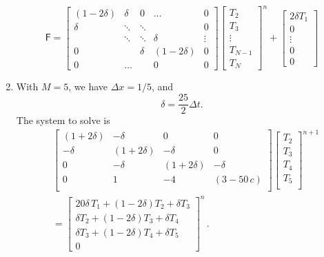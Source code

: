 \documentclass[11pt]{article}
\newcommand{\per}{\, .}
\def\beq{\begin{equation}}
\def\eeq{\end{equation}}
\begin{document}
\begin{enumerate}[label=(\alph*)]
\beq
\mathsf{F} = \left[ \begin{matrix}
        (1-2\delta) & \delta &0 &\ldots &0\\
        \delta & \ddots & \ddots & &0\\
               & \ddots &\ddots & \delta &\vdots\\
        0 & & \delta & (1-2\delta)&0\\
0 & \ldots&  & 0 &0\end{matrix} \right]
 \left[ \begin{matrix}
         T_2\\
         T_3\\
         \vdots\\
         T_{N-1}\\
         T_N
 \end{matrix} \right]^{n} +
 \left[ \begin{matrix}
         2\delta T_1\\
         0\\
         \vdots\\
         0\\
         0
 \end{matrix} \right]
\eeq

    \item With $M = 5$, we have $\Delta x = 1/5$, and
        \beq
            \delta = \frac{25}{2}\Delta t.
        \eeq
        The system to solve is
\begin{align} \label{matrixM}
    & \left[ \begin{matrix}
            (1+2\delta) & -\delta & 0 & 0 \\
            -\delta & (1+2\delta)  & -\delta & 0\\
             0& -\delta & (1+2\delta)  & -\delta \\
             0&  1 & -4  & (3-50\,c) \\
           \end{matrix} \right]
           \left[ \begin{matrix}
         T_2\\
         T_3\\
         T_4\\
         T_5\\
 \end{matrix} \right]^{n+1}\\ &=
 \left[ \begin{matrix}
         20\delta \,T_1 + (1 -2\delta)T_2 + \delta T_3 \\
         \delta T_2+  (1 -2\delta)T_3 + \delta T_4\\
         \delta T_3+  (1 -2\delta)T_4 +  \delta T_5\\
         0
 \end{matrix} \right]^n\per
\end{align}



\end{enumerate}        
\end{document}
